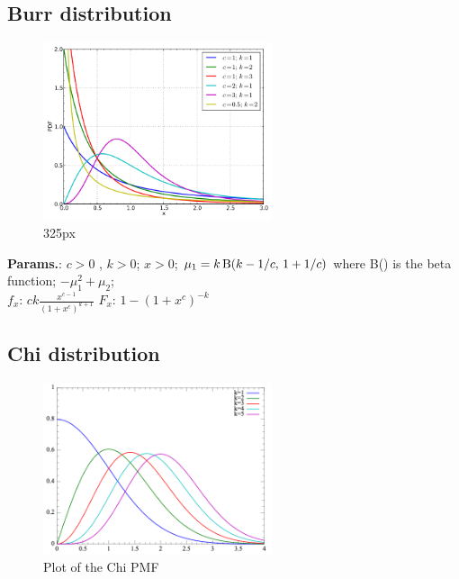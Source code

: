     
        
\subsection{Burr distribution}


    \begin{figure}[H]
        \centering
        \includegraphics[width=0.6\textwidth]{images/Burr pdf.png}
        \caption{325px}
    \end{figure}




    {\color{darkblue} \textbf{Params.}:} {$c > 0\!$ ,  $k > 0\!$}; {$x > 0\!$}; {$\mu_1=k\operatorname{\mathrm{B}}(k-1/c,\, 1+1/c)$ where Β() is the beta function}; {$-\mu_1^2+\mu_2$};\hspace{0.5cm}\\{\color{darkblue} \textbf{$f_x$}:} {$ck\frac{x^{c-1}}{(1+x^c)^{k+1}}\!$}{\color{darkblue} \textbf{$F_x$}:} {$1-\left(1+x^c\right)^{-k}$}



    
        
\subsection{Chi distribution}


    \begin{figure}[H]
        \centering
        \includegraphics[width=0.6\textwidth]{images/Chi distribution PDF.png}
        \caption{Plot of the Chi PMF}
    \end{figure}




